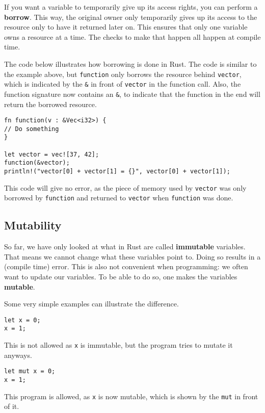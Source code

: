 If you want a variable to temporarily give up its access rights, you can perform a \textbf{borrow}. This way, the original owner only temporarily gives up its access to the resource only to have it returned later on. This ensures that only one variable owns a resource at a time.  %
The checks to make that happen all happen at compile time.

The code below illustrates how borrowing is done in Rust. The code is similar to the example above, but \verb|function| only borrows the resource behind \verb|vector|, which is indicated by the \verb|&| in front of \verb|vector| in the function call. Also, the function signature now contains an \verb|&|, to indicate that the function in the end will return the borrowed resource. 

\begin{verbatim}
fn function(v : &Vec<i32>) {
// Do something
}

let vector = vec![37, 42];
function(&vector);
println!("vector[0] + vector[1] = {}", vector[0] + vector[1]);
\end{verbatim}

This code will give no error, as the piece of memory used by \verb|vector| was only borrowed by \verb|function| and returned to \verb|vector| when \verb|function| was done. 

\subsection{Mutability}
So far, we have only looked at what in Rust are called \textbf{immutable} variables. That means we cannot change what these variables point to. Doing so results in a (compile time) error. This is also not convenient when programming: we often want to update our variables. To be able to do so, one makes the variables \textbf{mutable}.

Some very simple examples can illustrate the difference.

\begin{verbatim}
let x = 0;
x = 1;
\end{verbatim}
This is not allowed as \verb|x| is immutable, but the program tries to mutate it anyways. 

\begin{verbatim}
let mut x = 0;
x = 1;
\end{verbatim}
This program is allowed, as \verb|x| is now mutable, which is shown by the \verb|mut| in front of it. 

